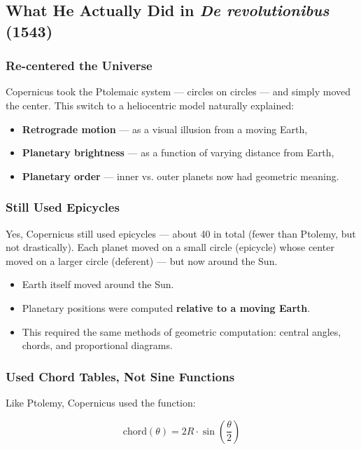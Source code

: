 \subsection{What He Actually Did in \textit{De revolutionibus} (1543)}

\subsubsection{Re-centered the Universe}

Copernicus took the Ptolemaic system — circles on circles — and simply moved the center. This switch to a heliocentric model naturally explained:

\begin{itemize}
  \item \textbf{Retrograde motion} — as a visual illusion from a moving Earth,
  \item \textbf{Planetary brightness} — as a function of varying distance from Earth,
  \item \textbf{Planetary order} — inner vs. outer planets now had geometric meaning.
\end{itemize}

\subsubsection{Still Used Epicycles}

Yes, Copernicus still used epicycles — about 40 in total (fewer than Ptolemy, but not drastically). Each planet moved on a small circle (epicycle) whose center moved on a larger circle (deferent) — but now around the Sun.

\begin{itemize}
  \item Earth itself moved around the Sun.
  \item Planetary positions were computed \textbf{relative to a moving Earth}.
  \item This required the same methods of geometric computation: central angles, chords, and proportional diagrams.
\end{itemize}

\subsubsection{Used Chord Tables, Not Sine Functions}

Like Ptolemy, Copernicus used the function:

\[
\text{chord}(\theta) = 2R \cdot \sin\left(\frac{\theta}{2}\right)
\]

